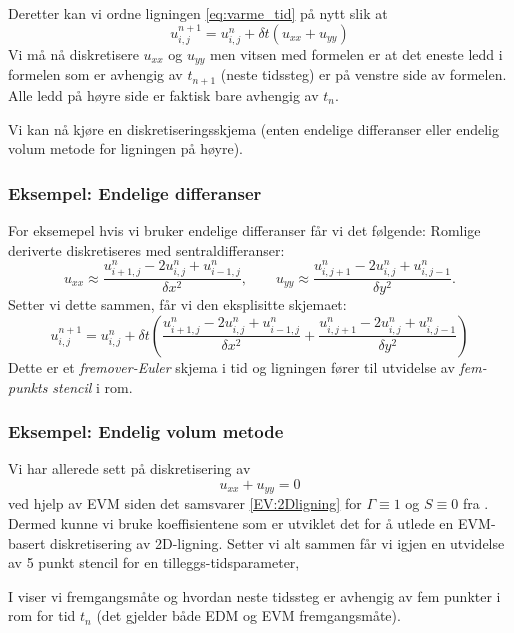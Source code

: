 Deretter kan vi ordne ligningen \eqref{eq:varme_tid} på nytt slik at
\[u_{i,j}^{n+1} = u_{i,j}^n + \delta t (u_{xx} + u_{yy})\]
Vi må nå diskretisere $u_{xx}$ og $u_{yy}$ men vitsen med formelen er at det eneste ledd i formelen som er avhengig av $t_{n+1}$ (neste tidssteg) er på venstre side av formelen. Alle ledd på høyre side er faktisk bare avhengig av $t_n$.

Vi kan nå kjøre en diskretiseringsskjema (enten endelige differanser eller endelig volum metode for ligningen på høyre). 

\subsubsection*{Eksempel: Endelige differanser}
For eksemepel hvis vi bruker endelige differanser får vi det følgende: 
Romlige deriverte diskretiseres med sentraldifferanser:
\[
u_{xx} \approx \frac{u^n_{i+1,j} - 2u^n_{i,j} + u^n_{i-1,j}}{\delta x^2}, \qquad
u_{yy} \approx \frac{u^n_{i,j+1} - 2u^n_{i,j} + u^n_{i,j-1}}{\delta y^2}.
\]
Setter vi dette sammen, får vi den eksplisitte skjemaet:
\[
u^{n+1}_{i,j} = u^n_{i,j} + \delta t \left(
\frac{u^n_{i+1,j} - 2u^n_{i,j} + u^n_{i-1,j}}{\delta x^2} +
\frac{u^n_{i,j+1} - 2u^n_{i,j} + u^n_{i,j-1}}{\delta y^2}\right)
\]
Dette er et \emph{fremover-Euler} skjema i tid og ligningen fører til utvidelse av \emph{fem-punkts stencil}  i rom. 

\subsubsection{Eksempel: Endelig volum metode}

Vi har allerede sett på diskretisering av 
$$u_{xx}+u_{yy}=0$$
ved hjelp av EVM siden det samsvarer \eqref{EV:2Dligning} for $\Gamma \equiv 1$ og $S\equiv 0$ fra . Dermed kunne vi bruke koeffisientene som er utviklet det for å utlede en EVM-basert diskretisering av 2D-ligning. Setter vi alt sammen får vi igjen en utvidelse av 5 punkt stencil for en tilleggs-tidsparameter,

I  viser vi fremgangsmåte og hvordan neste tidssteg er avhengig av fem punkter i rom for tid $t_n$ (det gjelder både EDM og EVM fremgangsmåte).



